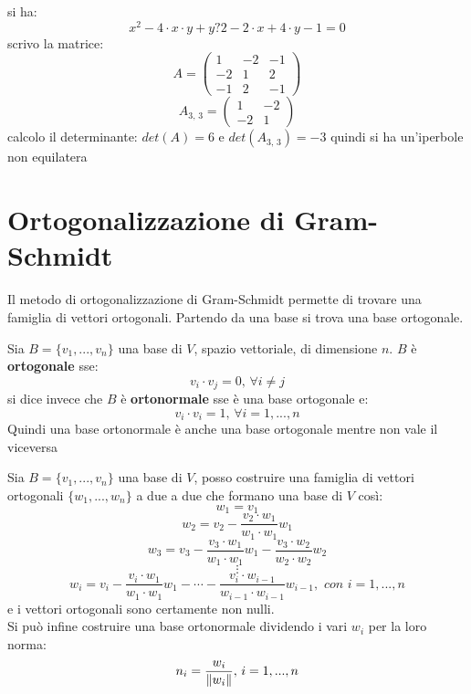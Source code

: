 \documentclass[a4paper,12pt, oneside]{book}
\begin{document}
\begin{esercizio}
si ha:
$$x^2-4\cdot x\cdot y+y?2-2\cdot x+4\cdot y-1=0$$
scrivo la matrice:
$$
A=\left(\begin{matrix}
1 & -2 & -1\\
-2 & 1 & 2\\
-1 & 2 & -1
\end{matrix}\right)
$$
$$
A_{3,\,3}=\left(\begin{matrix}
1 & -2\\
-2 & 1
\end{matrix}\right)
$$
calcolo il determinante: $det(A)=6$ e $det(A_{3,\,3})=-3$ quindi si ha un'iperbole non equilatera
\end{esercizio}
\section{Ortogonalizzazione di Gram-Schmidt}
Il metodo di ortogonalizzazione di Gram-Schmidt permette di trovare una famiglia di vettori ortogonali. Partendo da una base si trova una base ortogonale.
\begin{definizione}
Sia $B=\{v_1,...,v_n\}$ una base di $V$, spazio vettoriale, di dimensione $n$. $B$ è \textbf{ortogonale} sse:
$$v_i\cdot v_j=0,\, \forall i\neq j$$
si dice invece che $B$ è \textbf{ortonormale} sse è una base ortogonale e:
$$v_i\cdot v_i=1,\,\forall i=1,...,n$$
Quindi una base ortonormale è anche una base ortogonale mentre non vale il viceversa 
\end{definizione}
\begin{teorema}
Sia $B=\{v_1,...,v_n\}$ una base di $V$, posso costruire una famiglia di vettori ortogonali $\{w_1,...,w_n\}$ a due a due che formano una base di $V$ così:
$$w_1=v_1$$
$$w_2=v_2-\frac{v_2\cdot w_1}{w_1\cdot w_1}w_1$$
$$w_3=v_3-\frac{v_3\cdot w_1}{w_1\cdot w_1}w_1-\frac{v_3\cdot w_2}{w_2\cdot w_2}w_2$$
$$\vdots$$
$$w_i=v_i-\frac{v_i\cdot w_1}{w_1\cdot w_1}w_1-\cdots-\frac{v_i\cdot w_{i-1}}{w_{i-1}\cdot w_{i-1}}w_{i-1},\,\, con\,\, i=1,...,n$$
e i vettori ortogonali sono certamente non nulli.\\
Si può infine costruire una base ortonormale dividendo i vari $w_i$ per la loro norma:
$$n_i=\frac{w_i}{\left\lVert {w_i} \right\rVert},\, i=1,...,n$$
\end{teorema}
\end{document}
